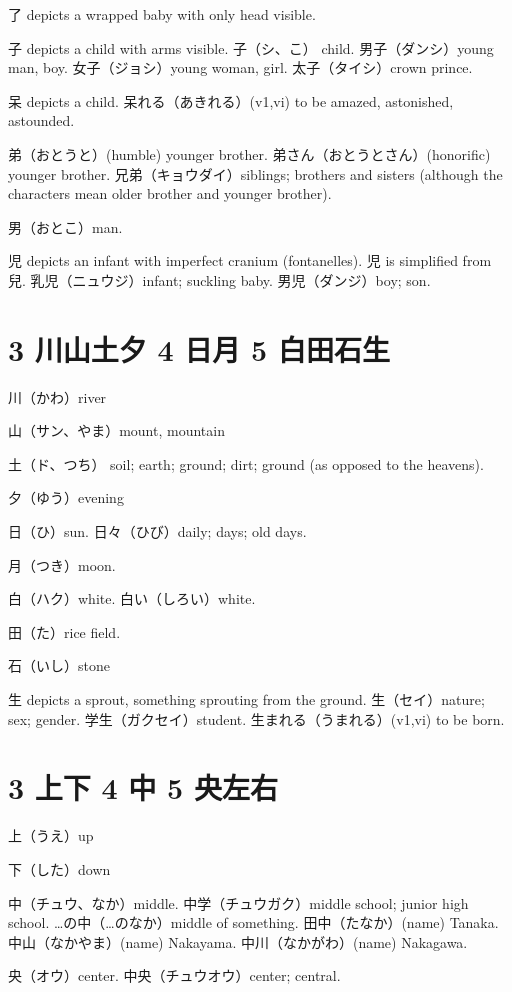了 depicts a wrapped baby with only head visible.

子 depicts a child with arms visible.
子（シ、こ） child.
男子（ダンシ）young man, boy.
女子（ジョシ）young woman, girl.
太子（タイシ）crown prince.

呆 depicts a child.
呆れる（あきれる）(v1,vi) to be amazed, astonished, astounded.

弟（おとうと）(humble) younger brother.
弟さん（おとうとさん）(honorific) younger brother.
兄弟（キョウダイ）siblings;
brothers and sisters
(although the characters mean older brother and younger brother).

男（おとこ）man.

児 depicts an infant with imperfect cranium (fontanelles).
児 is simplified from 兒.
乳児（ニュウジ）infant; suckling baby.
男児（ダンジ）boy; son.

\section{3 川山土夕 4 日月 5 白田石生}

川（かわ）river

山（サン、やま）mount, mountain

土（ド、つち）
soil; earth; ground; dirt; ground (as opposed to the heavens).

夕（ゆう）evening

日（ひ）sun.
日々（ひび）daily; days; old days.

月（つき）moon.

白（ハク）white.
白い（しろい）white.

田（た）rice field.

石（いし）stone

生 depicts a sprout, something sprouting from the ground.
生（セイ）nature; sex; gender.
学生（ガクセイ）student.
生まれる（うまれる）(v1,vi) to be born.

\section{3 上下 4 中 5 央左右}

上（うえ）up

下（した）down

中（チュウ、なか）middle.
中学（チュウガク）middle school; junior high school.
…の中（…のなか）middle of something.
田中（たなか）(name) Tanaka.
中山（なかやま）(name) Nakayama.
中川（なかがわ）(name) Nakagawa.

央（オウ）center.
中央（チュウオウ）center; central.

